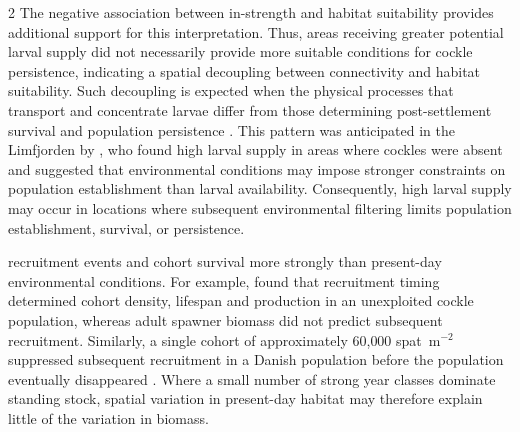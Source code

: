 \begin{spacing}{2}
 The negative association between in-strength and habitat suitability provides additional support for this interpretation.  Thus, areas receiving greater potential larval supply did not necessarily provide more suitable conditions for cockle persistence, indicating a spatial decoupling between connectivity and habitat suitability. Such decoupling is expected when the physical processes that transport and concentrate larvae differ from those determining post-settlement survival and population persistence \citep[e.g.][]{whiteScaleDependentChangesImportance2008}. This pattern was anticipated in the Limfjorden by \citet{hansenAssessingDemographicConnectivity2024}, who found high larval supply in areas where cockles were absent and suggested that environmental conditions may impose stronger constraints on population establishment than larval availability. Consequently, high larval supply may occur in locations where subsequent environmental filtering limits population establishment, survival, or persistence.

 recruitment events and cohort survival more strongly than present-day environmental conditions. For example, \citet{magalhaesCocklePopulationDynamics2016} found that recruitment timing determined cohort density, lifespan and production in an unexploited cockle population, whereas adult spawner biomass did not predict subsequent recruitment. Similarly, a single cohort of approximately 60{,}000 spat~m$^{-2}$ suppressed subsequent recruitment in a Danish population before the population eventually disappeared \citep{f46a34c986624a1baee20a526e50e3c9}. Where a small number of strong year classes dominate standing stock, spatial variation in present-day habitat may therefore explain little of the variation in biomass.


\end{spacing}
